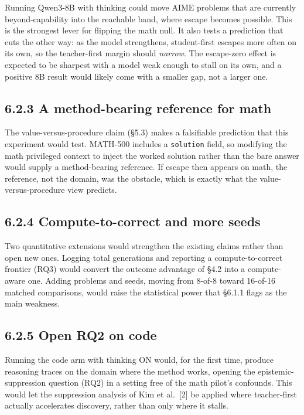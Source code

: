 Running Qwen3-8B with thinking could move AIME problems that are currently beyond-capability into the reachable band, where escape becomes possible. This is the strongest lever for flipping the math null. It also tests a prediction that cuts the other way: as the model strengthens, student-first escapes more often on its own, so the teacher-first margin should \emph{narrow}. The escape-zero effect is expected to be sharpest with a model weak enough to stall on its own, and a positive 8B result would likely come with a smaller gap, not a larger one.

\subsection{6.2.3 A method-bearing reference for math}\label{a-method-bearing-reference-for-math}

The value-versus-procedure claim (§5.3) makes a falsifiable prediction that this experiment would test. MATH-500 includes a \passthrough{\lstinline!solution!} field, so modifying the math privileged context to inject the worked solution rather than the bare answer would supply a method-bearing reference. If escape then appears on math, the reference, not the domain, was the obstacle, which is exactly what the value-versus-procedure view predicts.

\subsection{6.2.4 Compute-to-correct and more seeds}\label{compute-to-correct-and-more-seeds}

Two quantitative extensions would strengthen the existing claims rather than open new ones. Logging total generations and reporting a compute-to-correct frontier (RQ3) would convert the outcome advantage of §4.2 into a compute-aware one. Adding problems and seeds, moving from 8-of-8 toward 16-of-16 matched comparisons, would raise the statistical power that §6.1.1 flags as the main weakness.

\subsection{6.2.5 Open RQ2 on code}\label{open-rq2-on-code}

Running the code arm with thinking ON would, for the first time, produce reasoning traces on the domain where the method works, opening the epistemic-suppression question (RQ2) in a setting free of the math pilot's confounds. This would let the suppression analysis of Kim et al.~{[}2{]} be applied where teacher-first actually accelerates discovery, rather than only where it stalls.
